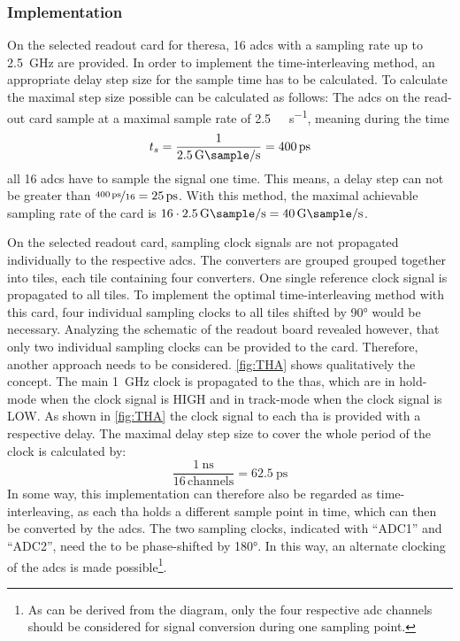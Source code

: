 \subsubsection{Implementation}\label{ssec:interl_impl}
On the selected readout card for \gls{theresa}, 16 \glspl{adc} with a sampling rate up to \SI{2.5}{\GHz} are provided.
In order to implement the time-interleaving method, an appropriate delay step size for the sample time has to be calculated.
To calculate the maximal step size possible can be calculated as follows: 
The \glspl{adc} on the read-out card sample at a maximal sample rate of \SI{2.5}{\giga \sample \per \second}, meaning during the time
\begin{equation}
	t_s = \frac{1}{\SI{2.5}{\giga \sample \per \second}} = \SI{400}{\pico \second}
\end{equation}
all 16 \glspl{adc} have to sample the signal one time.
This means, a delay step can not be greater than $\nicefrac{\SI{400}{\pico\second}}{16} = \SI{25}{\pico\second}$.
With this method, the maximal achievable sampling rate of the card is $16 \cdot \SI{2.5}{\giga \sample \per \second}  = \SI{40}{\giga \sample \per \second}$. 

On the selected readout card, sampling clock signals are not propagated individually to the respective \glspl{adc}.
The converters are grouped grouped together into tiles, each tile containing four converters. One single reference clock signal is propagated to all tiles. 
To implement the optimal time-interleaving method with this card, four individual sampling clocks to all tiles shifted by \ang{90} would be necessary.
Analyzing the schematic of the readout board revealed however, that only two individual sampling clocks can be provided to the card.
Therefore, another approach needs to be considered.
\autoref{fig:THA} shows qualitatively the concept.
The main \SI{1}{\GHz} clock is propagated to the \glspl{tha}, which are in hold-mode when the clock signal is HIGH and in track-mode when the clock signal is LOW.
As shown in \autoref{fig:THA} the clock signal to each \gls{tha} is provided with a respective delay.
The maximal delay step size to cover the whole period of the clock is calculated by: 
\begin{equation}
	\frac{\SI{1}{\nano \second}}{16 \, \text{channels}} = \SI{62.5}{\pico \second}
\end{equation}
In some way, this implementation can therefore also be regarded as time-interleaving, as each \gls{tha} holds a different sample point in time, which can then be converted by the \glspl{adc}.
The two sampling clocks, indicated with ``ADC1'' and ``ADC2'', need the to be phase-shifted by \ang{180}.
In this way, an alternate clocking of the \glspl{adc} is made possible\footnote{As can be derived from the diagram, only the four respective \gls{adc} channels should be considered for signal conversion during one sampling point.}.

